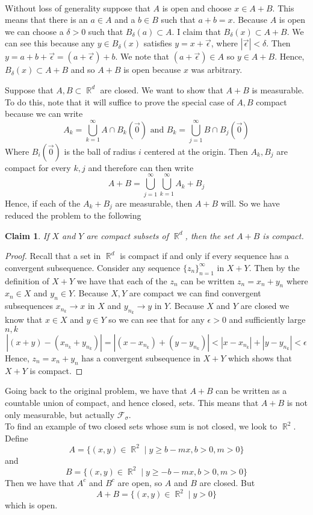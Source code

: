 \documentclass{article}
\DeclareMathOperator{\R}{\mathbb{R}}
\DeclareMathOperator{\suchthat}{\mathrel{|}}
\newcommand{\problem}[1]{\noindent{\textbf{Problem #1}}\\}
\newcommand{\problempart}[1]{\noindent{\textbf{(#1)}}}
\newtheorem*{claim}{Claim}
\begin{document}
\problem{1.6.19}
\problempart{a} Without loss of generality suppose that $A$ is open and choose $x \in A+B$. This means that there is an $a \in A$ and a $b\in B$ such that $a+b = x$. Because $A$ is open we can choose a $\delta > 0$ such that $B_\delta(a) \subset A$. I claim that $B_\delta(x) \subset A+B$. We can see this because any $y \in B_\delta(x)$ satisfies $y = x + \vec{\epsilon}$, where $|\vec{\epsilon}| < \delta$. Then $y = a + b + \vec{\epsilon} = (a+\vec{\epsilon}) + b$. We note that $(a + \vec{\epsilon}) \in A$ so $y \in A+B$. Hence, $B_\delta(x) \subset A+B$ and so $A+B$ is open because $x$ was arbitrary.  

\problempart{b} Suppose that $A,B \subset \R^d$ are closed. We want to show that $A+B$ is measurable. To do this, note that it will suffice to prove the special case of $A,B$ compact because we can write 
\[
A_k = \bigcup_{k=1}^\infty A \cap B_k(\vec{0}) \text{ and } B_k = \bigcup_{j=1}^\infty B \cap B_j(\vec{0})
\]
Where $B_i(\vec{0})$ is the ball of radius $i$ centered at the origin. Then $A_k,B_j$ are compact for every $k,j$ and therefore can then write
\[
A+B = \bigcup_{j=1}^\infty\bigcup_{k=1}^\infty A_k + B_j
\]
Hence, if each of the $A_k + B_j$ are measurable, then $A+B$ will. So we have reduced the problem to the following\\
\begin{claim}
If $X$ and $Y$ are compact subsets of $\R^d$, then the set $A+B$ is compact. 
\end{claim}
\begin{proof}
Recall that a set in $\R^d$ is compact if and only if every sequence has a convergent subsequence. Consider any sequence $\{z_n\}_{n=1}^\infty$ in $X+Y$. Then by the definition of $X+Y$ we have that each of the $z_n$ can be written $z_n = x_n + y_n$ where $x_n \in X$ and $y_n \in Y$. Because $X,Y$ are compact we can find convergent subsequences $x_{n_k} \to x$ in $X$ and $y_{n_k} \to y$ in $Y$. Because $X$ and $Y$ are closed we know that $x \in X$ and $y \in Y$ so we can see that for any $\epsilon > 0$ and sufficiently large $n,k$
\[
|(x+y) - (x_{n_k} + y_{n_k})| = |(x- x_{n_k}) + (y - y_{n_k})| < |x - x_{n_k}| + |y - y_{n_k}| < \epsilon
\]
Hence, $z_n = x_n + y_n$ has a convergent subsequence in $X+Y$ which shows that $X+Y$ is compact. 
\end{proof}
Going back to the original problem, we have that $A+B$ can be written as a countable union of compact, and hence closed, sets. This means that $A+B$ is not only measurable, but actually $\mathcal{F}_\sigma$.\\
\problempart{c} To find an example of two closed sets whose sum is not closed, we look to $\R^2$. Define 
\[
A = \{(x,y) \in \R^2 \suchthat y \geq b - mx, b > 0,m > 0\}
\]
and
\[
B = \{(x,y) \in \R^2 \suchthat y\geq -b - mx, b > 0,m > 0 \}
\]
Then we have that $A^c$ and $B^c$ are open, so $A$ and $B$ are closed. But 
\[
A+B = \{(x,y) \in \R^2 \suchthat y > 0\}
\]
which is open. 
\end{document}
